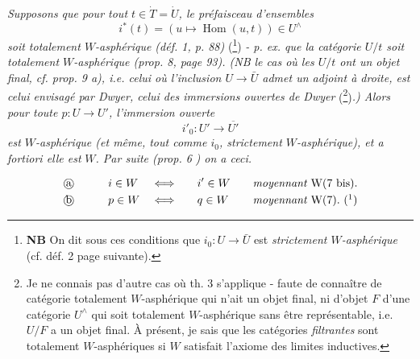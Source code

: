 \textit{Supposons que pour tout $t\in\dot{T}=\dot{U}$, le préfaisceau d'ensembles}
\[ i^*(t)=(u\longmapsto\operatorname{Hom}(u,t))\in U^\wedge \]
\textit{soit totalement $W$-asphérique (déf. 1, p. 88)} (\footnote{\textbf{NB} On dit sous ces conditions que $i_0:U\longrightarrow\bar{U}$ est \textit{strictement $W$-asphérique} (cf. déf. 2 page suivante).}) \textit{- p. ex. que la catégorie $U/t$ soit totalement $W$-asphérique (prop. 8, page 93). (NB le cas où les $U/t$ ont un objet final, cf. prop. 9 a), i.e. celui où l'inclusion $U\longrightarrow\bar{U}$ admet un adjoint à droite, est celui envisagé par Dwyer, celui des immersions ouvertes de Dwyer} (\footnote{Je ne connais pas d'autre cas où th. 3 s'applique - faute de connaître de catégorie totalement $W$-asphérique qui n'ait un objet final, ni d'objet $F$ d'une catégorie $U^\wedge$ qui soit totalement $W$-asphérique sans être représentable, i.e. $U/F$ a un objet final. À présent, je sais que les catégories \textit{filtrantes} sont totalement $W$-asphériques si $W$ satisfait l'axiome des limites inductives.})\textit{.) Alors pour toute $p:U\longrightarrow U'$, l'immersion ouverte}
\[ i'_0:U'\longrightarrow\overline{U'} \]
\textit{est $W$-asphérique (et même, tout comme $i_0$, strictement $W$-asphérique), et a fortiori elle est} \textit{$W$. Par suite (prop. 6} \textit{) on a ceci.}

\[
\begin{aligned}
&\text{\textcircled{a}}\qquad && i\in W && \Longleftrightarrow\quad && i'\in W\quad && \textit{moyennant } \mathrm{W}(7\text{ bis}).\\
&\text{\textcircled{b}}\qquad && p\in W && \Longleftrightarrow\quad && q\in W\quad && \textit{moyennant } \mathrm{W}(7).\ (\footnotemark)
\end{aligned}
\]

